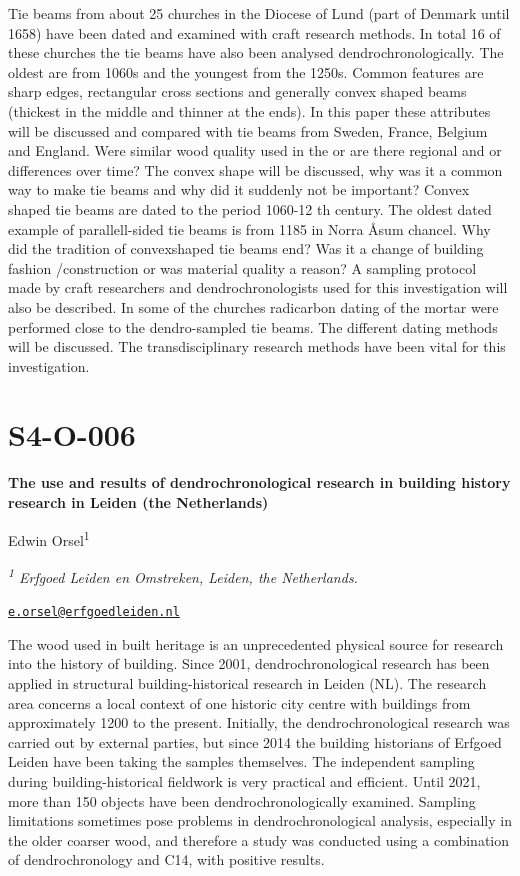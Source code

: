 \documentclass[
]{book}
\begin{document}
Tie beams from about 25 churches in the Diocese of Lund (part of Denmark until 1658) have been dated and examined with craft research methods. In total 16 of these churches the tie beams have also been analysed dendrochronologically. The oldest are from 1060s and the youngest from the 1250s. Common features are sharp edges, rectangular cross sections and generally convex shaped beams (thickest in the middle and thinner at the ends). In this paper these attributes will be discussed and compared with tie beams from Sweden, France, Belgium and England. Were similar wood quality used in the or are there regional and or differences over time? The convex shape will be discussed, why was it a common way to make tie beams and why did it suddenly not be important? Convex shaped tie beams are dated to the period 1060-12 th century. The oldest dated example of parallell-sided tie beams is from 1185 in Norra Åsum chancel. Why did the tradition of convexshaped tie beams end? Was it a change of building fashion /construction or was material quality a reason? A sampling protocol made by craft researchers and dendrochronologists used for this investigation will also be described. In some of the churches radicarbon dating of the mortar were performed close to the dendro-sampled tie beams. The different dating methods will be discussed. The transdisciplinary research methods have been vital for this investigation.

\hypertarget{s4-o-006}{%
\section*{S4-O-006}\label{s4-o-006}}

\textbf{The use and results of dendrochronological research in building history research in Leiden (the Netherlands)}

Edwin Orsel\textsuperscript{1}

\emph{\textsuperscript{1} Erfgoed Leiden en Omstreken, Leiden, the Netherlands.}

\href{mailto:e.orsel@erfgoedleiden.nl}{\nolinkurl{e.orsel@erfgoedleiden.nl}}

The wood used in built heritage is an unprecedented physical source for research into the history of building. Since 2001, dendrochronological research has been applied in structural building-historical research in Leiden (NL). The research area concerns a local context of one historic city centre with buildings from approximately 1200 to the present. Initially, the dendrochronological research was carried out by external parties, but since 2014 the building historians of Erfgoed Leiden have been taking the samples themselves. The independent sampling during building-historical fieldwork is very practical and efficient. Until 2021, more than 150 objects have been dendrochronologically examined. Sampling limitations sometimes pose problems in dendrochronological analysis, especially in the older coarser wood, and therefore a study was conducted using a combination of dendrochronology and C14, with positive results.
\end{document}
